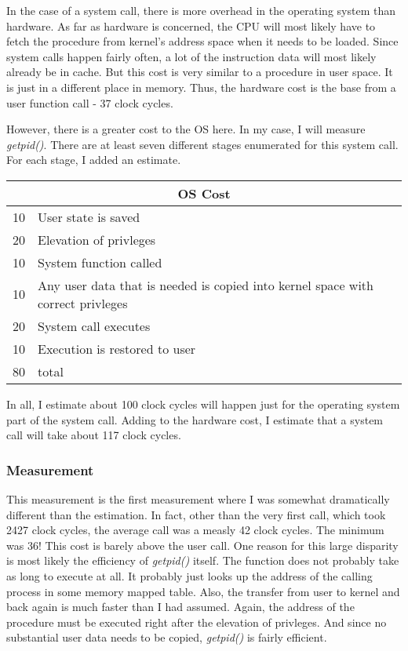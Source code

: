 \documentclass[paper=a4, fontsize=11pt]{scrartcl}
\numberwithin{equation}{section}        %
\numberwithin{figure}{section}          %
\numberwithin{table}{section}               %
\begin{document}
In the case of a system call, there is more overhead in the operating system than hardware.  As far as hardware is concerned, the CPU will most likely have to fetch the procedure from kernel's address space when it needs to be loaded.  Since system calls happen fairly often, a lot of the instruction data will most likely already be in cache.  But this cost is very similar to a procedure in user space.  It is just in a different place in memory.  Thus, the hardware cost is the base from a user function call - 37 clock cycles.

However, there is a greater cost to the OS here.  In my case, I will measure \textit{getpid()}.  There are at least seven different stages enumerated for this system call.  For each stage, I added an estimate.



\begin{tabular}{ |l|l| }
  \hline
  \multicolumn{2}{|c|}{OS Cost} \\
  \hline
  10 & User state is saved \\
  20 & Elevation of privleges \\
  10 & System function called \\
  10 & Any user data that is needed is copied into kernel space with correct privleges \\
  20 & System call executes \\
  10 & Execution is restored to user \\
  \hline
  80 & total \\
  \hline
\end{tabular}


In all, I estimate about 100 clock cycles will happen just for the operating system part of the system call.  Adding to the hardware cost, I estimate that a system call will take about 117 clock cycles.

\subsubsection{Measurement}

This measurement is the first measurement where I was somewhat dramatically different than the estimation.  In fact, other than the very first call, which took 2427 clock cycles, the average call was a measly 42 clock cycles.  The minimum was 36!  This cost is barely above the user call.  One reason for this large disparity is most likely the efficiency of \textit{getpid()} itself.  The function does not probably take as long to execute at all.  It probably just looks up the address of the calling process in some memory mapped table.  Also, the transfer from user to kernel and back again is much faster than I had assumed.  Again, the address of the procedure must be executed right after the elevation of privleges.  And since no substantial user data needs to be copied, \textit{getpid()} is fairly efficient.
\end{document}
